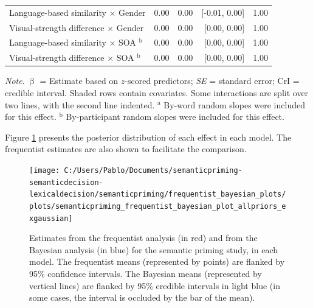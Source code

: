 \documentclass[
  12pt,
  man,floatsintext]{apa7}
\begin{document}
\begin{table}[!h]
\begin{threeparttable}
\begin{tabular}[t]{lrrrr}
\hspace{1em}Language-based similarity  $\times$  Gender & 0.00 & 0.00 & {}[-0.01, 0.00] & 1.00\\
\hspace{1em}Visual-strength difference  $\times$  Gender & 0.00 & 0.00 & {}[0.00, 0.00] & 1.00\\
\hspace{1em}Language-based similarity  $\times$  SOA $^{\text{b}}$ & 0.00 & 0.00 & {}[0.00, 0.00] & 1.00\\
\hspace{1em}Visual-strength difference  $\times$  SOA $^{\text{b}}$ & 0.00 & 0.00 & {}[0.00, 0.00] & 1.00\\
\bottomrule
\end{tabular}
\begin{tablenotes}
\item \textit{\linebreak} 
\item \textit{Note}. $\upbeta$ = Estimate based on $z$-scored predictors; \textit{SE} = standard error; \linebreak \phantom{.}CrI = credible interval. Shaded rows contain covariates. Some interactions \linebreak \phantom{.}are split over two lines, with the second line indented. \linebreak \linebreak \phantom{.}$^{\text{a}}$ By-word random slopes were included for this effect. \linebreak \phantom{.}$^{\text{b}}$ By-participant random slopes were included for this effect.
\end{tablenotes}
\end{threeparttable}
\end{table}

\clearpage

Figure \ref{fig:semanticpriming-frequentist-bayesian-plot-allpriors-exgaussian} presents the posterior distribution of each effect in each model. The frequentist estimates are also shown to facilitate the comparison.

\begin{figure}

{\centering \texttt{[image: C:/Users/Pablo/Documents/semanticpriming-semanticdecision-lexicaldecision/semanticpriming/frequentist\_bayesian\_plots/plots/semanticpriming\_frequentist\_bayesian\_plot\_allpriors\_exgaussian]} 

}

\caption{Estimates from the frequentist analysis (in red) and from the Bayesian analysis (in blue) for the semantic priming study, in each model. The frequentist means (represented by points) are flanked by 95\% confidence intervals. The Bayesian means (represented by vertical lines) are flanked by 95\% credible intervals in light blue (in some cases, the interval is occluded by the bar of the mean).}\label{fig:semanticpriming-frequentist-bayesian-plot-allpriors-exgaussian}
\end{figure}
\end{document}
